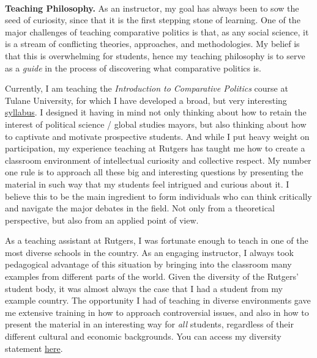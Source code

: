 \vspace{-2cm}{\bf \huge Teaching Statement}\\

{\bf Teaching Philosophy.} As an instructor, my goal has always been to sow the seed of curiosity, since that it is the first stepping stone of learning. One of the major challenges of teaching comparative politics is that, as any social science, it is a stream of conflicting theories, approaches, and methodologies. My belief is that this is overwhelming for students, hence my teaching philosophy is to serve as a \emph{guide} in the process of discovering what comparative politics is.


Currently, I am teaching the \emph{Introduction to Comparative Politics} course at Tulane University, for which I have developed a broad, but very interesting \href{https://github.com/hbahamonde/Comparative_Politics_UGRAD/raw/master/Bahamonde_Comparative_Politics_Syllabus_UGRAD.pdf}{syllabus}. I designed it having in mind not only thinking about how to retain the interest of political science / global studies mayors, but also thinking about how to captivate and motivate prospective students. And while I put heavy weight on participation, my experience teaching at Rutgers has taught me how to create a classroom environment of intellectual curiosity and collective respect. My number one rule is to approach all these big and interesting questions by presenting the material in such way that my students feel intrigued and curious about it. I believe this to be the main ingredient to form individuals who can think critically and navigate the major debates in the field. Not only from a theoretical perspective, but also from an applied point of view.

As a teaching assistant at Rutgers, I was fortunate enough to teach in one of the most diverse schools in the country. As an engaging instructor, I always took pedagogical advantage of this situation by bringing into the classroom many examples from different parts of the world. Given the diversity of the Rutgers' student body, it was almost always the case that I had a student from my example country. The opportunity I had of teaching in diverse environments gave me extensive training in how to approach controversial issues, and also in how to present the material in an interesting way for \emph{all} students, regardless of their different cultural and economic backgrounds. You can access my diversity statement \href{http://github.com/hbahamonde/Job_Market/raw/master/Bahamonde_Diversity_Statement.pdf}{here}.


